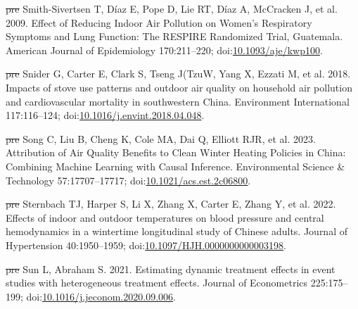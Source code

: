 \documentclass[
  letterpaper,
  DIV=11,
  numbers=noendperiod]{scrartcl}
\newlength{\cslhangindent}
\newenvironment{CSLReferences}[2] %
 {\begin{list}{}{%
  \setlength{\itemindent}{0pt} %
  \setlength{\leftmargin}{0pt} %
  \setlength{\parsep}{0pt} %
  \ifodd #1
   \setlength{\leftmargin}{\cslhangindent} %
   \setlength{\itemindent}{-1\cslhangindent} %
  \fi
  \setlength{\itemsep}{#2\baselineskip}}} %
 {\end{list}} %
\providecommand{\DIFdeltex}[1]{{\protect\color{red}\sout{#1}}}                      %
\providecommand{\DIFaddbegin}{} %
\providecommand{\DIFaddend}{} %
\providecommand{\DIFdelbegin}{} %
\providecommand{\DIFdelend}{} %
\providecommand{\DIFdel}[1]{\texorpdfstring{\DIFdeltex{#1}}{}} %
\newcommand{\DIFscaledelfig}{0.5}
\newlength{\DIFdelgraphicswidth} %
\newlength{\DIFdelgraphicsheight} %
\newcommand{\DIFaddincludegraphics}[2][]{{\color{blue}\fbox{\DIFOincludegraphics[#1]{#2}}}} %
\newcommand{\DIFdelincludegraphics}[2][]{%
\sbox{\DIFdelgraphicsbox}{\DIFOincludegraphics[#1]{#2}}%
\settoboxwidth{\DIFdelgraphicswidth}{\DIFdelgraphicsbox} %
\settoboxtotalheight{\DIFdelgraphicsheight}{\DIFdelgraphicsbox} %
\scalebox{\DIFscaledelfig}{%
\parbox[b]{\DIFdelgraphicswidth}{\usebox{\DIFdelgraphicsbox}\\[-\baselineskip] \rule{\DIFdelgraphicswidth}{0em}}\llap{\resizebox{\DIFdelgraphicswidth}{\DIFdelgraphicsheight}{%
\setlength{\unitlength}{\DIFdelgraphicswidth}%
\begin{picture}(1,1)%
\thicklines\linethickness{2pt} %
{\color[rgb]{1,0,0}\put(0,0){\framebox(1,1){}}}%
{\color[rgb]{1,0,0}\put(0,0){\line( 1,1){1}}}%
{\color[rgb]{1,0,0}\put(0,1){\line(1,-1){1}}}%
\end{picture}%
}\hspace*{3pt}}} %
} %
\DeclareRobustCommand{\DIFaddbegin}{\DIFOaddbegin \let\includegraphics\DIFaddincludegraphics} %
\DeclareRobustCommand{\DIFaddend}{\DIFOaddend \let\includegraphics\DIFOincludegraphics} %
\DeclareRobustCommand{\DIFdelbegin}{\DIFOdelbegin \let\includegraphics\DIFdelincludegraphics} %
\DeclareRobustCommand{\DIFdelend}{\DIFOaddend \let\includegraphics\DIFOincludegraphics} %
\begin{document}
\begin{CSLReferences}{1}{1}
\DIFdelbegin %
\DIFdel{pre}%
\DIFdelend \DIFaddbegin {}
\DIFaddend Smith-Sivertsen T, Díaz E, Pope D, Lie RT, Díaz A, McCracken J, et al.
2009. Effect of {Reducing Indoor Air Pollution} on {Women}'s
{Respiratory Symptoms} and {Lung Function}: {The RESPIRE Randomized
Trial}, {Guatemala}. American Journal of Epidemiology 170:211--220;
doi:\href{https://doi.org/10.1093/aje/kwp100}{10.1093/aje/kwp100}.

\DIFdelbegin %
\DIFdel{pre}%
\DIFdelend \DIFaddbegin {}
\DIFaddend Snider G, Carter E, Clark S, Tseng J(TzuW, Yang X, Ezzati M, et al.
2018. Impacts of stove use patterns and outdoor air quality on household
air pollution and cardiovascular mortality in southwestern {China}.
Environment International 117:116--124;
doi:\href{https://doi.org/10.1016/j.envint.2018.04.048}{10.1016/j.envint.2018.04.048}.

\DIFdelbegin %
\DIFdel{pre}%
\DIFdelend \DIFaddbegin {}
\DIFaddend Song C, Liu B, Cheng K, Cole MA, Dai Q, Elliott RJR, et al. 2023.
Attribution of {Air Quality Benefits} to {Clean Winter Heating Policies}
in {China}: {Combining Machine Learning} with {Causal Inference}.
Environmental Science \& Technology 57:17707--17717;
doi:\href{https://doi.org/10.1021/acs.est.2c06800}{10.1021/acs.est.2c06800}.

\DIFdelbegin %
\DIFdel{pre}%
\DIFdelend \DIFaddbegin {}
\DIFaddend Sternbach TJ, Harper S, Li X, Zhang X, Carter E, Zhang Y, et al. 2022.
Effects of indoor and outdoor temperatures on blood pressure and central
hemodynamics in a wintertime longitudinal study of {Chinese} adults.
Journal of Hypertension 40:1950--1959;
doi:\href{https://doi.org/10.1097/HJH.0000000000003198}{10.1097/HJH.0000000000003198}.

\DIFdelbegin %
\DIFdel{pre}%
\DIFdelend \DIFaddbegin {}
\DIFaddend Sun L, Abraham S. 2021. Estimating dynamic treatment effects in event
studies with heterogeneous treatment effects. Journal of Econometrics
225:175--199;
doi:\href{https://doi.org/10.1016/j.jeconom.2020.09.006}{10.1016/j.jeconom.2020.09.006}.


\end{CSLReferences}
\end{document}
